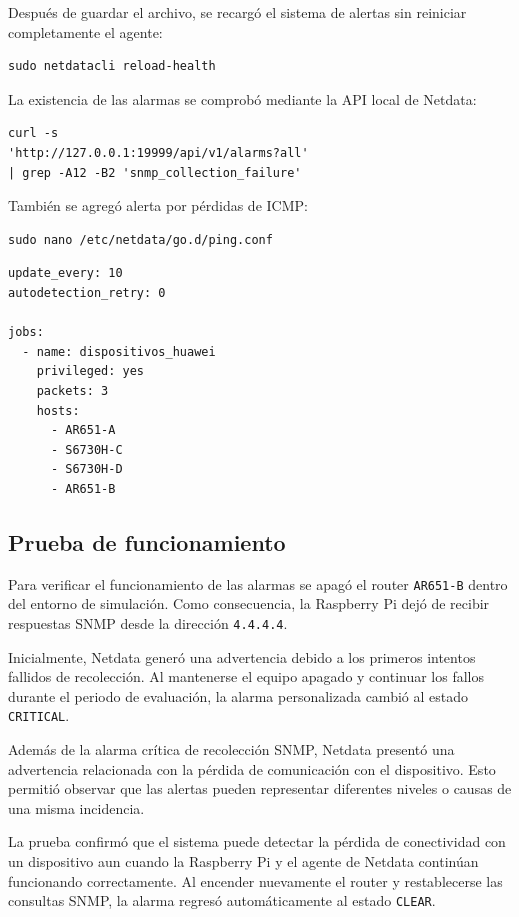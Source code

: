 Después de guardar el archivo, se recargó el sistema de alertas sin reiniciar completamente el agente:

\begin{lstlisting}[style=terminal]
sudo netdatacli reload-health
\end{lstlisting}

La existencia de las alarmas se comprobó mediante la API local de Netdata:

\begin{lstlisting}[style=terminal]
curl -s 
'http://127.0.0.1:19999/api/v1/alarms?all' 
| grep -A12 -B2 'snmp_collection_failure'
\end{lstlisting}

También se agregó alerta por pérdidas de ICMP:

\begin{lstlisting}[style=terminal]
sudo nano /etc/netdata/go.d/ping.conf
\end{lstlisting}


\begin{lstlisting}[style=terminal]
update_every: 10 
autodetection_retry: 0

jobs:
  - name: dispositivos_huawei
    privileged: yes
    packets: 3
    hosts:
      - AR651-A
      - S6730H-C
      - S6730H-D
      - AR651-B
\end{lstlisting}



\subsection{Prueba de funcionamiento}

Para verificar el funcionamiento de las alarmas se apagó el router \texttt{AR651-B} dentro del entorno de simulación. Como consecuencia, la Raspberry Pi dejó de recibir respuestas SNMP desde la dirección \texttt{4.4.4.4}.

Inicialmente, Netdata generó una advertencia debido a los primeros intentos fallidos de recolección. Al mantenerse el equipo apagado y continuar los fallos durante el periodo de evaluación, la alarma personalizada cambió al estado \texttt{CRITICAL}.

Además de la alarma crítica de recolección SNMP, Netdata presentó una advertencia relacionada con la pérdida de comunicación con el dispositivo. Esto permitió observar que las alertas pueden representar diferentes niveles o causas de una misma incidencia.

La prueba confirmó que el sistema puede detectar la pérdida de conectividad con un dispositivo aun cuando la Raspberry Pi y el agente de Netdata continúan funcionando correctamente. Al encender nuevamente el router y restablecerse las consultas SNMP, la alarma regresó automáticamente al estado \texttt{CLEAR}.

